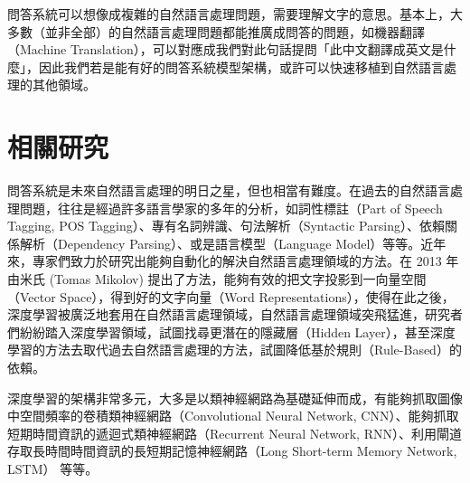 問答系統可以想像成複雜的自然語言處理問題，需要理解文字的意思。基本上，大多數（並非全部）的自然語言處理問題都能推廣成問答的問題，如機器翻譯（Machine Translation），可以對應成我們對此句話提問「此中文翻譯成英文是什麼」，因此我們若是能有好的問答系統模型架構，或許可以快速移植到自然語言處理的其他領域。

\section{相關研究}%
問答系統是未來自然語言處理的明日之星，但也相當有難度。在過去的自然語言處理問題，往往是經過許多語言學家的多年的分析，如詞性標註（Part of Speech Tagging, POS Tagging）、專有名詞辨識、句法解析（Syntactic Parsing）、依賴關係解析（Dependency Parsing）、或是語言模型（Language Model）等等。近年來，專家們致力於研究出能夠自動化的解決自然語言處理領域的方法。在 2013 年由米氏 (Tomas Mikolov) 提出了方法，能夠有效的把文字投影到一向量空間（Vector Space），得到好的文字向量（Word Representations）\cite{mikolov2013efficient}，使得在此之後，深度學習被廣泛地套用在自然語言處理領域，自然語言處理領域突飛猛進，研究者們紛紛踏入深度學習領域，試圖找尋更潛在的隱藏層（Hidden Layer），甚至深度學習的方法去取代過去自然語言處理的方法，試圖降低基於規則（Rule-Based）的依賴。

深度學習的架構非常多元，大多是以類神經網路為基礎延伸而成，有能夠抓取圖像中空間頻率的卷積類神經網路（Convolutional Neural Network, CNN）\cite{lecun1995convolutional}\cite{jia2014caffe}、能夠抓取短期時間資訊的遞迴式類神經網路（Recurrent Neural Network, RNN）\cite{mikolov2010recurrent}、利用閘道存取長時間時間資訊的長短期記憶神經網路（Long Short-term Memory Network, LSTM）\cite{hochreiter1997long} 等等。

